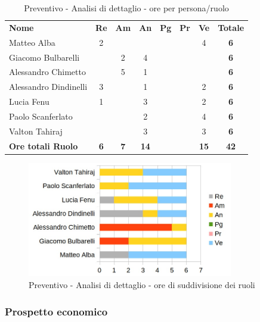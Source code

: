 		\begin{table} [h!]
			\begin{center}
				\begin{tabular} { m{3.5cm} c c c c c c c }
					\rowcolor{lightgray}
					\textbf{Nome} & \textbf{Re} & \textbf{Am} & \textbf{An} & \textbf{Pg} & \textbf{Pr} & \textbf{Ve} & \textbf{Totale} \\
					Matteo Alba & 2 & & & & & 4 & \textbf{6} \\
					Giacomo Bulbarelli & & 2 & 4 & & & & \textbf{6} \\
					Alessandro Chimetto & & 5 & 1 & & & & \textbf{6} \\
					Alessandro Dindinelli & 3 & & 1 & & & 2 & \textbf{6} \\
					Lucia Fenu & 1 & & 3 & & & 2 & \textbf{6} \\
					Paolo Scanferlato & & & 2 & & & 4 & \textbf{6} \\
					Valton Tahiraj & & & 3 & & & 3 & \textbf{6} \\
					\textbf{Ore totali Ruolo} & \textbf{6} & \textbf{7} & \textbf{14} & \textbf{} & \textbf{}& \textbf{15} & \textbf{42}
				\end{tabular}
				\caption{Preventivo - Analisi di dettaglio - ore per persona/ruolo}
			\end{center}
		\end{table}
	
		\begin{figure} [h!]
			\centering
			\includegraphics[width=0.8\textwidth]{res/img/grafici/consolidamento_dei_requisiti_ore_ruolo.jpg}
			\caption{Preventivo - Analisi di dettaglio - ore di suddivisione dei ruoli} 
		\end{figure}
		
	\newpage

	\subsubsection{Prospetto economico}
	
